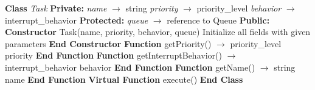 \documentclass[a4paper,11pt]{article}
\begin{document}
\begin{algorithm}
\caption{Base Task Class}
\begin{algorithmic}[1]
\State \textbf{Class} \textit{Task}
\State \hspace{0.5cm} \textbf{Private:}
\State \hspace{1cm} \textit{name} $\rightarrow$ string
\State \hspace{1cm} \textit{priority} $\rightarrow$ priority\_level
\State \hspace{1cm} \textit{behavior} $\rightarrow$ interrupt\_behavior
\State \hspace{0.5cm} \textbf{Protected:}
\State \hspace{1cm} \textit{queue} $\rightarrow$ reference to Queue
\State \hspace{0.5cm} \textbf{Public:}
\State \hspace{1cm} \textbf{Constructor} Task(name, priority, behavior, queue)
\State \hspace{1.5cm} Initialize all fields with given parameters
\State \hspace{1cm} \textbf{End Constructor}
\vspace{0.3cm}
\State \hspace{1cm} \textbf{Function} getPriority() $\rightarrow$ priority\_level
\State \hspace{1.5cm} \Return priority
\State \hspace{1cm} \textbf{End Function}
\vspace{0.3cm}
\State \hspace{1cm} \textbf{Function} getInterruptBehavior() $\rightarrow$ interrupt\_behavior
\State \hspace{1.5cm} \Return behavior
\State \hspace{1cm} \textbf{End Function}
\vspace{0.3cm}
\State \hspace{1cm} \textbf{Function} getName() $\rightarrow$ string
\State \hspace{1.5cm} \Return name
\State \hspace{1cm} \textbf{End Function}
\vspace{0.3cm}
\State \hspace{1cm} \textbf{Virtual Function} execute() 
\State \textbf{End Class}
\end{algorithmic}
\end{algorithm}
\end{document}
